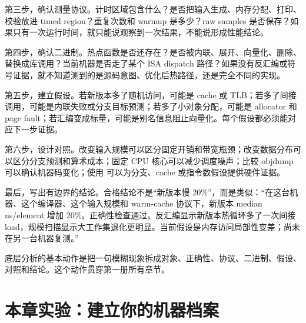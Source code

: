 第三步，确认测量协议。计时区域包含什么？是否把输入生成、内存分配、打印、校验放进 timed region？重复次数和 warmup 是多少？raw samples 是否保存？如果只有一次运行时间，就只能说观察到一次结果，不能说形成性能结论。

第四步，确认二进制。热点函数是否还存在？是否被内联、展开、向量化、删除、替换成库调用？当前机器是否走了某个 ISA dispatch 路径？如果没有反汇编或符号证据，就不知道测到的是源码意图、优化后热路径，还是完全不同的实现。

第五步，建立假设。若新版本多了随机访问，可能是 cache 或 TLB；若多了间接调用，可能是内联失败或分支目标预测；若多了小对象分配，可能是 allocator 和 page fault；若汇编变成标量，可能是别名信息阻止向量化。每个假设都必须能对应下一步证据。

第六步，设计对照。改变输入规模可以区分固定开销和带宽瓶颈；改变数据分布可以区分分支预测和算术成本；固定 CPU 核心可以减少调度噪声；比较 objdump 可以确认机器码变化；使用  可以为分支、cache 或指令数假设提供硬件证据。

最后，写出有边界的结论。合格结论不是“新版本慢 20\%”，而是类似：“在这台机器、这个编译器、这个输入规模和 warm-cache 协议下，新版本 median ns/element 增加 20\%。正确性检查通过。反汇编显示新版本热循环多了一次间接 load，规模扫描显示大工作集退化更明显。当前假设是内存访问局部性变差；尚未在另一台机器复测。”

\begin{keyidea}
底层分析的基本动作是把一句模糊现象拆成对象、正确性、协议、二进制、假设、对照和结论。这个动作贯穿第一册所有章节。
\end{keyidea}

\section{本章实验：建立你的机器档案}


